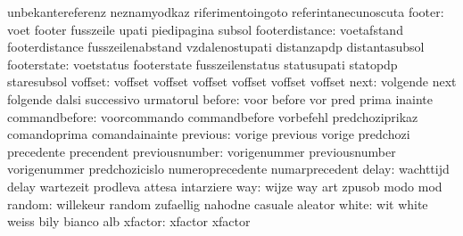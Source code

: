                            unbekantereferenz         neznamyodkaz
                           riferimentoingoto         referintanecunoscuta
                   footer: voet                      footer
                           fusszeile                 upati
                           piedipagina               subsol
           footerdistance: voetafstand               footerdistance
                           fusszeilenabstand         vzdalenostupati
                           distanzapdp               distantasubsol
              footerstate: voetstatus                footerstate
                           fusszeilenstatus          statusupati
                           statopdp                  staresubsol
                  voffset: voffset                   voffset
                           voffset                   voffset
                           voffset                   voffset
                     next: volgende                  next
                           folgende                  dalsi
                           successivo                urmatorul
                   before: voor                      before
                           vor                       pred
                           prima                     inainte
            commandbefore: voorcommando              commandbefore
                           vorbefehl                 predchoziprikaz
                           comandoprima              comandainainte
                 previous: vorige                    previous
                           vorige                    predchozi
                           precedente                precendent
           previousnumber: vorigenummer              previousnumber
                           vorigenummer              predchozicislo
                           numeroprecedente          numarprecedent
                    delay: wachttijd                 delay
                           wartezeit                 prodleva
                           attesa                    intarziere
                      way: wijze                     way
                           art                       zpusob
                           modo                      mod
                   random: willekeur                 random
                           zufaellig                 nahodne
                           casuale                   aleator
                    white: wit                       white
                           weiss                     bily
                           bianco                    alb
                  xfactor: xfactor                   xfactor
